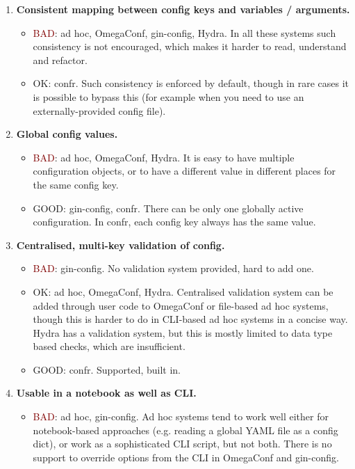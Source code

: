 \documentclass{itatnew}
\begin{document}
\begin{enumerate}
\begin{itemize}
        \end{itemize}
    \item \textbf{Consistent mapping between config keys and variables / arguments.}
        \begin{itemize}
            \item \textcolor{Maroon}{BAD}: ad hoc, OmegaConf, gin-config, Hydra. In all these systems such consistency is not encouraged, which makes it harder to read, understand and refactor.
            \item \textcolor{YellowOrange}{OK}: confr. Such consistency is enforced by default, though in rare cases it is possible to bypass this (for example when you need to use an externally-provided config file).
        \end{itemize}
    \item \textbf{Global config values.}
        \begin{itemize}
            \item \textcolor{Maroon}{BAD}: ad hoc, OmegaConf, Hydra. It is easy to have multiple configuration objects, or to have a different value in different places for the same config key.
            \item \textcolor{OliveGreen}{GOOD}: gin-config, confr. There can be only one globally active configuration. In confr, each config key always has the same value.
        \end{itemize}
    \item \textbf{Centralised, multi-key validation of config.}
        \begin{itemize}
            \item \textcolor{Maroon}{BAD}: gin-config. No validation system provided, hard to add one.
            \item \textcolor{YellowOrange}{OK}: ad hoc, OmegaConf, Hydra. Centralised validation system can be added through user code to OmegaConf or file-based ad hoc systems, though this is harder to do in CLI-based ad hoc systems in a concise way. Hydra has a validation system, but this is mostly limited to data type based checks, which are insufficient.
            \item \textcolor{OliveGreen}{GOOD}: confr. Supported, built in.
        \end{itemize}
    \item \textbf{Usable in a notebook as well as CLI.}
        \begin{itemize}
            \item \textcolor{Maroon}{BAD}: ad hoc, gin-config. Ad hoc systems tend to work well either for notebook-based approaches (e.g. reading a global YAML file as a config dict), or work as a sophisticated CLI script, but not both. There is no support to override options from the CLI in OmegaConf and gin-config.

\end{itemize}
\end{enumerate}
\end{document}
